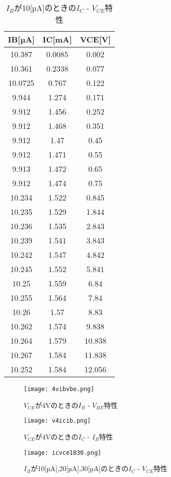 \documentclass[a4j,10pt,dvipdfmx]{jarticle}
\begin{document}
\begin{table}[H]
\label{4}
\begin{center}
\caption{$I_B$が10[µA]のときの$I_C$ - $V_{CE}$特性}
\begin{tabular}{ccc} \\
\hline
IB[µA] & IC[mA] & VCE[V] \\ \hline
10.387 & 0.0085 & 0.002 \\
10.361 & 0.2338 & 0.077 \\
10.0725 & 0.767 & 0.122 \\
9.944 & 1.274 & 0.171 \\
9.912 & 1.456 & 0.252 \\
9.912 & 1.468 & 0.351 \\
9.912 & 1.47 & 0.45 \\
9.912 & 1.471 & 0.55 \\
9.913 & 1.472 & 0.65 \\
9.912 & 1.474 & 0.75 \\
10.234 & 1.522 & 0.845 \\
10.235 & 1.529 & 1.844 \\
10.236 & 1.535 & 2.843 \\
10.239 & 1.541 & 3.843 \\
10.242 & 1.547 & 4.842 \\
10.245 & 1.552 & 5.841 \\
10.25 & 1.559 & 6.84 \\
10.255 & 1.564 & 7.84 \\
10.26 & 1.57 & 8.83 \\
10.262 & 1.574 & 9.838 \\
10.264 & 1.579 & 10.838 \\
10.267 & 1.584 & 11.838 \\
10.252 & 1.584 & 12.056 \\ \hline
\end{tabular}
\end{center}
\end{table}
\begin{figure}[H]
  \begin{center}
  \texttt{[image: 4vibvbe.png]}
  \caption{$V_{CE}$が4Vのときの$I_B$ - $V_{BE}$特性}
\end{center}
\end{figure}
\begin{figure}[H]
  \begin{center}
  \texttt{[image: v4icib.png]}
  \caption{$V_{CE}$が4Vのときの$I_C$ - $I_B$特性}
\end{center}
\end{figure}
\begin{figure}[H]
  \begin{center}
  \label{1030}
  \texttt{[image: icvce1030.png]}
  \caption{$I_B$が10[µA],20[µA],30[µA]のときの$I_C$ - $V_{CE}$特性}
\end{center}
\end{figure}
\end{document}
